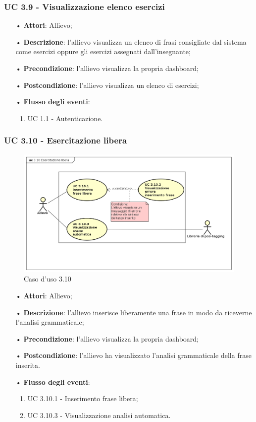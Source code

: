 \subsubsection{UC 3.9 - Visualizzazione elenco esercizi}
\begin{itemize}
\item[•]\textbf{Attori}: Allievo;
\item[•]\textbf{Descrizione}:  l'allievo visualizza un elenco di frasi consigliate dal sistema come esercizi oppure gli esercizi assegnati dall'insegnante;
\item[•]\textbf{Precondizione}: l'allievo visualizza la propria dashboard;
\item[•]\textbf{Postcondizione}: l'allievo visualizza un elenco di esercizi;
\item[•]\textbf{Flusso degli eventi}:
	\begin{enumerate}
	\item UC 1.1 - Autenticazione.
\end{enumerate}
\end{itemize}

\subsubsection{UC 3.10 - Esercitazione libera}
\begin{figure}[H]
	\centering
	\includegraphics[width=17cm]{img/UC310.png} 
	\caption{Caso d'uso 3.10}\label{fig:310}
\end{figure}
\begin{itemize}
\item[•]\textbf{Attori}: Allievo;
\item[•]\textbf{Descrizione}: l'allievo inserisce liberamente una frase in modo da riceverne l'analisi grammaticale;
\item[•]\textbf{Precondizione}: l'allievo visualizza la propria dashboard;
\item[•]\textbf{Postcondizione}: l'allievo ha visualizzato l'analisi grammaticale della frase inserita.
\item[•]\textbf{Flusso degli eventi}:
\begin{enumerate}
	\item UC 3.10.1 - Inserimento frase libera;
	\item UC 3.10.3 - Visualizzazione analisi automatica.
\end{enumerate}
\end{itemize}

